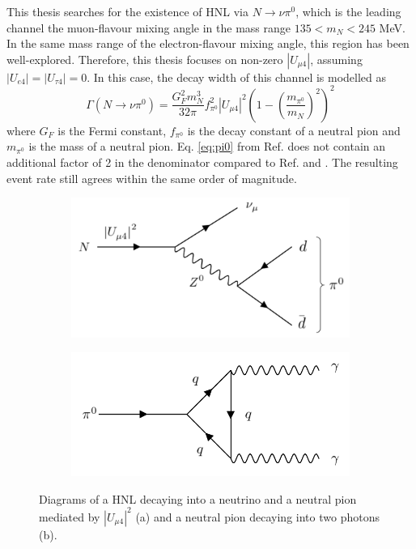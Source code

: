 This thesis searches for the existence of HNL via $N\rightarrow\nu \pi^{0}$, which is the leading channel the muon-flavour mixing angle in the mass range $ 135 < m_{N} < 245 $ MeV.
In the same mass range of the electron-flavour mixing angle, this region has been well-explored.
Therefore, this thesis focuses on non-zero $|U_{\mu4}|$, assuming $|U_{e4}| = |U_{\tau4}| = 0$.  
In this case, the decay width of this channel is modelled as \cite{HNLZarko}
\begin{equation}
	\Gamma(N\rightarrow \nu \pi^{0}) = \frac{G_{F}^{2}m_{N}^{3}}{32\pi}f^{2}_{\pi^{0}}|U_{\mu4}|^{2}\left(1-\left(\frac{m_{\pi^{0}}}{m_{N}}\right)^{2}\right)^{2}
\label{eq:pi0}
\end{equation}
where $G_{F}$ is the Fermi constant, $f_{\pi^{0}}$ is the decay constant of a neutral pion and $m_{\pi^{0}}$ is the mass of a neutral pion.
Eq. \ref{eq:pi0} from Ref. \cite{HNLZarko} does not contain an additional factor of 2 in the denominator compared to Ref. \cite{SBNHNL} and \cite{HNLBin}.
The resulting event rate still agrees within the same order of magnitude.

\begin{figure}[htbp!]
\begin{subfigure}[h]{0.49\linewidth}
\centering    
\includegraphics[width=\linewidth]{N_to_pi0_edit}
\caption{}
\end{subfigure}
\hfill
\begin{subfigure}[h]{0.49\linewidth}
\centering    
\includegraphics[width=\linewidth]{pi0_to_gam}
\caption{}
\end{subfigure}%
\caption[decayDiagram]{
Diagrams of a HNL decaying into a neutrino and a neutral pion mediated by $|U_{\mu4}|^{2}$ (a) and a neutral pion decaying into two photons (b).
}\label{fig:decayDiagram}
\end{figure}

